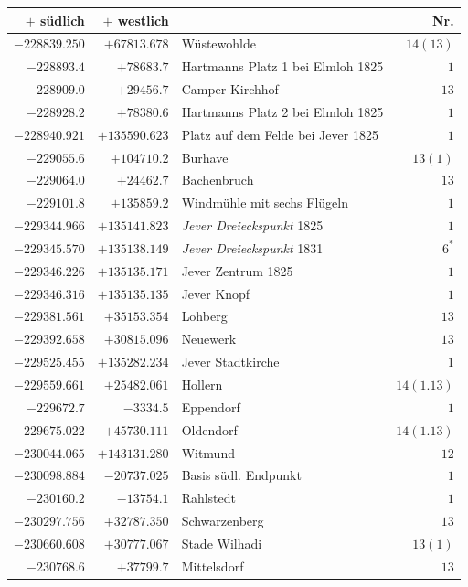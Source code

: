 \begin{center}\begingroup\fontsize{8}{9}\selectfont
\setlength{\tabcolsep}{4pt}
\begin{tabular}{r|r|p{170pt}|r}\hline
\(+\) südlich&\(+\) westlich&&Nr.\\\hline
\(-228839.250\)&\(+67813.678\)&Wüstewohlde&\(14(13)\)\\
\(-228893.4\)&\(+78683.7\)&Hartmanns Platz 1 bei Elmloh 1825&\(1\)\\
\(-228909.0\)&\(+29456.7\)&Camper Kirchhof&\(13\)\\
\(-228928.2\)&\(+78380.6\)&Hartmanns Platz 2 bei Elmloh 1825&\(1\)\\
\(-228940.921\)&\(+135590.623\)&Platz auf dem Felde bei Jever 1825&\(1\)\\
\(-229055.6\)&\(+104710.2\)&Burhave&\(13(1)\)\\
\(-229064.0\)&\(+24462.7\)&Bachenbruch&\(13\)\\
\(-229101.8\)&\(+135859.2\)&Windmühle mit sechs Flügeln&\(1\)\\
\(-229344.966\)&\(+135141.823\)&\textit{Jever Dreieckspunkt} 1825&\(1\)\\
\(-229345.570\)&\(+135138.149\)&\textit{Jever Dreieckspunkt} 1831&\(6^{*}\)\\
\(-229346.226\)&\(+135135.171\)&Jever Zentrum 1825&\(1\)\\
\(-229346.316\)&\(+135135.135\)&Jever Knopf&\(1\)\\
\(-229381.561\)&\(+35153.354\)&Lohberg&\(13\)\\
\(-229392.658\)&\(+30815.096\)&Neuewerk&\(13\)\\
\(-229525.455\)&\(+135282.234\)&Jever Stadtkirche&\(1\)\\
\(-229559.661\)&\(+25482.061\)&Hollern&\(14(1.13)\)\\
\(-229672.7\)&\(-3334.5\)&Eppendorf&\(1\)\\
\(-229675.022\)&\(+45730.111\)&Oldendorf&\(14(1.13)\)\\
\(-230044.065\)&\(+143131.280\)&Witmund&\(12\)\\
\(-230098.884\)&\(-20737.025\)&Basis südl. Endpunkt&\(1\)\\
\(-230160.2\)&\(-13754.1\)&Rahlstedt&\(1\)\\
\(-230297.756\)&\(+32787.350\)&Schwarzenberg&\(13\)\\
\(-230660.608\)&\(+30777.067\)&Stade Wilhadi&\(13(1)\)\\
\(-230768.6\)&\(+37799.7\)&Mittelsdorf&\(13\)\\

\end{tabular}
\end{center}
